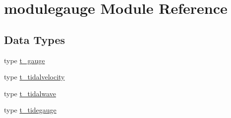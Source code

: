 \hypertarget{namespacemodulegauge}{}\section{modulegauge Module Reference}
\label{namespacemodulegauge}
\subsection*{Data Types}
\begin{DoxyCompactItemize}
\item 
type \mbox{\hyperlink{structmodulegauge_1_1t__gauge}{t\+\_\+gauge}}
\item 
type \mbox{\hyperlink{structmodulegauge_1_1t__tidalvelocity}{t\+\_\+tidalvelocity}}
\item 
type \mbox{\hyperlink{structmodulegauge_1_1t__tidalwave}{t\+\_\+tidalwave}}
\item 
type \mbox{\hyperlink{structmodulegauge_1_1t__tidegauge}{t\+\_\+tidegauge}}
\end{DoxyCompactItemize}
